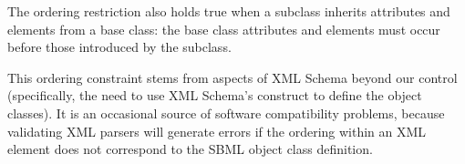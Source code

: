 The ordering restriction also holds true when a subclass inherits
attributes and elements from a base class: the base class
attributes and elements must occur before those introduced by the
subclass.

This ordering constraint stems from aspects of XML Schema beyond
our control (specifically, the need to use XML Schema's
 construct to define the object classes).  It is
an occasional source of software compatibility problems, because
validating XML parsers will generate errors if the ordering
within an XML element does not correspond to the SBML object class
definition.
